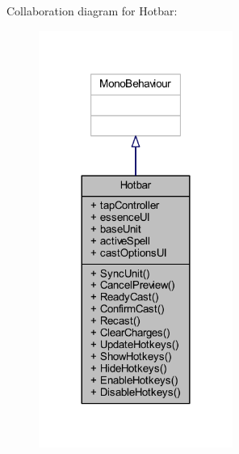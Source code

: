 Collaboration diagram for Hotbar\+:
\nopagebreak
\begin{figure}[H]
\begin{center}
\leavevmode
\includegraphics[width=180pt]{class_hotbar__coll__graph}
\end{center}
\end{figure}
